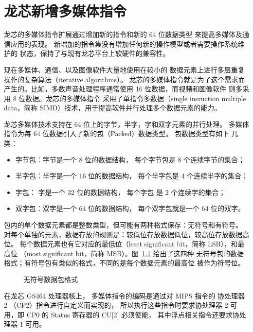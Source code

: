 \chapter{龙芯新增多媒体指令}\label{chp:simd}

龙芯的多媒体指令扩展通过增加新的指令和新的 64 位数据类型
来提高多媒体及通信应用的表现。
新增加的指令集没有增加任何新的操作模型或者需要操作系统维护的
状态，保持了与现有龙芯平台上软硬件的兼容性。

现在多媒体、通信、以及图像软件大量地使用在较小的
数据元素上进行多层重复操作的复杂算法（iterative algorithms）。
龙芯的多媒体指令就是为了这个需求而产生的。比如，多数声音处理程序通常使用 16
位数据，而视频和图像软件 则多采用 8 位数据。龙芯的多媒体指令
采用了单指令多数据（single insruction multiple data，简称
SIMD）技术，用于提高软件并行处理多个数据元素的能力。

龙芯多媒体技术支持在 64 位上的字节，半字，字和双字元素的并行处理。
多媒体指令为每 64 位数据引入了新的包（Packed）数据类型。 包数据类型有如下
几类：
\begin{itemize}
  \item 字节包：字节是一个  8 位的数据结构， 每个字节包是 8 个连续字节的集合；
  \item 半字包：半字是一个 16 位的数据结构， 每个半字包是 4 个连续半字的集合；
  \item   字包：  字是一个 32 位的数据结构， 每个字包  是 2 个连续字的集合；
  \item 双字包：双字是一个 64 位的数据结构， 每个双字包就是一个 64 位的双字。
\end{itemize}
包内的单个数据元素都是整数类型，但可能有两种格式保存：无符号和有符号。
对每个单独的元素，数据存放的规则是：较低位存放数据低位，较高位存放数据高位。
每个数据元素也有它对应的最低位（leset significant bit，简称 LSB），和最高位
（most significant bit，简称 MSB）。图~\ref{fig:packed-data} 给出了这四种
无符号包的数据格式；有符号包有类似的格式，不同的是每个数据元素的最高位
被作为符号位。

\begin{figure}[htbp]
  \centering
  \setlength\fboxsep{10pt}
  \setlength\fboxrule{.5pt}
  \caption{无符号数据包格式}
  \label{fig:packed-data}
\end{figure}

在龙芯 GS464 处理器核上， 多媒体指令的编码是通过对 MIPS 指令的 协处理器 2
（CP2）指令进行自定义而实现的， 所以执行这些指令时要求协处理器 2 可用，即 CP0
的 Status 寄存器的 CU[2] 必须使能， 其中浮点相关指令还要求协处理器 1 可用。

